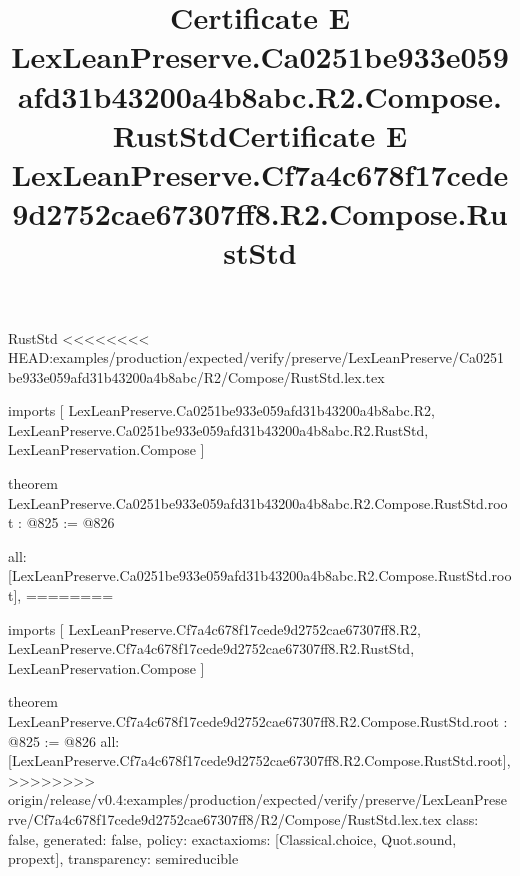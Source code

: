 \begin{lexlean}{RustStd}
<<<<<<<< HEAD:examples/production/expected/verify/preserve/LexLeanPreserve/Ca0251be933e059afd31b43200a4b8abc/R2/Compose/RustStd.lex.tex
\title{Certificate E LexLeanPreserve.Ca0251be933e059afd31b43200a4b8abc.R2.Compose.RustStd}
\begin{coremodule}
imports [
  LexLeanPreserve.Ca0251be933e059afd31b43200a4b8abc.R2,
  LexLeanPreserve.Ca0251be933e059afd31b43200a4b8abc.R2.RustStd,
  LexLeanPreservation.Compose
]

theorem LexLeanPreserve.Ca0251be933e059afd31b43200a4b8abc.R2.Compose.RustStd.root : @825 := @826 {
  all: [LexLeanPreserve.Ca0251be933e059afd31b43200a4b8abc.R2.Compose.RustStd.root],
========
\title{Certificate E LexLeanPreserve.Cf7a4c678f17cede9d2752cae67307ff8.R2.Compose.RustStd}
\begin{coremodule}
imports [
  LexLeanPreserve.Cf7a4c678f17cede9d2752cae67307ff8.R2,
  LexLeanPreserve.Cf7a4c678f17cede9d2752cae67307ff8.R2.RustStd,
  LexLeanPreservation.Compose
]

theorem LexLeanPreserve.Cf7a4c678f17cede9d2752cae67307ff8.R2.Compose.RustStd.root : @825 := @826 {
  all: [LexLeanPreserve.Cf7a4c678f17cede9d2752cae67307ff8.R2.Compose.RustStd.root],
>>>>>>>> origin/release/v0.4:examples/production/expected/verify/preserve/LexLeanPreserve/Cf7a4c678f17cede9d2752cae67307ff8/R2/Compose/RustStd.lex.tex
  class: false,
  generated: false,
  policy: exact{axioms: [Classical.choice, Quot.sound, propext]},
  transparency: semireducible
}


\end{coremodule}}
\end{coremodule}
\end{lexlean}
